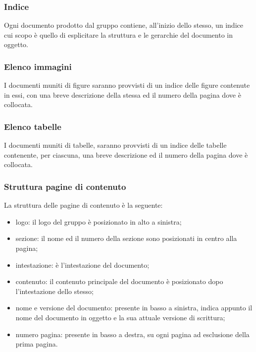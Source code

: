 \subsubsection{Indice}
Ogni documento prodotto dal gruppo {\Gruppo} contiene, all’inizio dello stesso, un indice cui scopo è quello di esplicitare la struttura e le gerarchie del documento in oggetto. 

\subsubsection{Elenco immagini}
I documenti muniti di figure saranno provvisti di un indice delle figure contenute in essi, con una breve descrizione della stessa ed il numero della pagina dove è collocata.

\subsubsection{Elenco tabelle}
I documenti muniti di tabelle, saranno provvisti di un indice delle tabelle contenente, per
ciascuna, una breve descrizione ed il numero della pagina dove è collocata.

\subsubsection{Struttura pagine di contenuto}
La struttura delle pagine di contenuto è la seguente:
\begin{itemize}
	\item logo: il logo del gruppo è posizionato in alto a sinistra;
	\item sezione: il nome ed il numero della sezione sono posizionati in centro alla pagina;
	\item intestazione: è l’intestazione del documento;
	\item contenuto: il contenuto principale del documento è posizionato dopo l’intestazione dello stesso;
	\item nome e versione del documento: presente in basso a sinistra, indica appunto il nome del documento in oggetto e la sua attuale versione di scrittura;
	\item numero pagina: presente in basso a destra, su ogni pagina ad esclusione della prima pagina.
\end{itemize}



